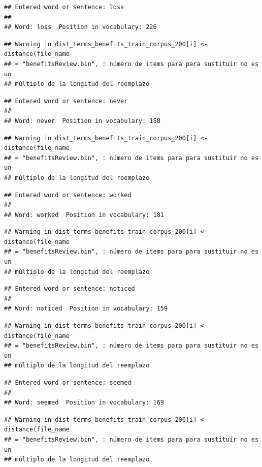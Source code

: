 \documentclass[spanish,]{article}
\begin{document}
\begin{verbatim}
## Entered word or sentence: loss
## 
## Word: loss  Position in vocabulary: 226
\end{verbatim}

\begin{verbatim}
## Warning in dist_terms_benefits_train_corpus_200[i] <- distance(file_name
## = "benefitsReview.bin", : número de items para para sustituir no es un
## múltiplo de la longitud del reemplazo
\end{verbatim}

\begin{verbatim}
## Entered word or sentence: never
## 
## Word: never  Position in vocabulary: 158
\end{verbatim}

\begin{verbatim}
## Warning in dist_terms_benefits_train_corpus_200[i] <- distance(file_name
## = "benefitsReview.bin", : número de items para para sustituir no es un
## múltiplo de la longitud del reemplazo
\end{verbatim}

\begin{verbatim}
## Entered word or sentence: worked
## 
## Word: worked  Position in vocabulary: 181
\end{verbatim}

\begin{verbatim}
## Warning in dist_terms_benefits_train_corpus_200[i] <- distance(file_name
## = "benefitsReview.bin", : número de items para para sustituir no es un
## múltiplo de la longitud del reemplazo
\end{verbatim}

\begin{verbatim}
## Entered word or sentence: noticed
## 
## Word: noticed  Position in vocabulary: 159
\end{verbatim}

\begin{verbatim}
## Warning in dist_terms_benefits_train_corpus_200[i] <- distance(file_name
## = "benefitsReview.bin", : número de items para para sustituir no es un
## múltiplo de la longitud del reemplazo
\end{verbatim}

\begin{verbatim}
## Entered word or sentence: seemed
## 
## Word: seemed  Position in vocabulary: 169
\end{verbatim}

\begin{verbatim}
## Warning in dist_terms_benefits_train_corpus_200[i] <- distance(file_name
## = "benefitsReview.bin", : número de items para para sustituir no es un
## múltiplo de la longitud del reemplazo
\end{verbatim}
\end{document}

